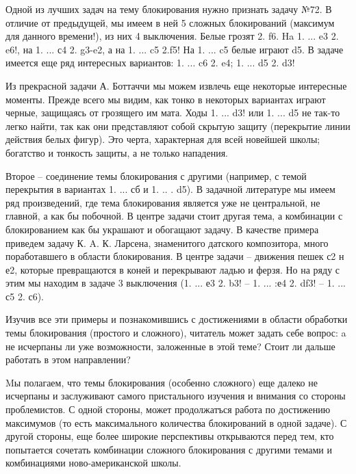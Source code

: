 Одной из лучших задач на тему блокирования нужно признать задачу №72. В отличие от предыдущей, мы имеем в ней 5 сложных блокирований (максимум для данного времени!), из них 4 выключения. Белые грозят 2. \queen{}f6\mate{}. Ha 1. ... \rook{}e3 2. \knight{}e6\mate{}!, на 1. ... \knight{}с4 2. \knight{}g3-e2\mate{}, а на 1. ... c5 2.\knight{}f5\mate{}! На 1. ... \rook{}c5 белые играют \knight{}d5\mate{}. В задаче имеется еще ряд интересных вариантов: 1. ... c6 2. \rook{}e4\mate{}; 1. ... d5 2. \knight{}d3\mate{}!
	
Из прекрасной задачи А. Боттаччи мы можем извлечь еще некоторые интересные моменты. Прежде всего мы видим, как тонко в некоторых вариантах играют черные, защищаясь от грозящего им мата. Ходы 1. ... \rook{}d3! или 1. ... d5 не так-то легко найти, так как они представляют собой скрытую защиту (перекрытие линии действия белых фигур). Это черта, характерная для всей новейшей школы; богатство и тонкость защиты, а не только нападения.

Второе -- соединение темы блокирования с другими (например, с темой перекрытия в вариантах 1. ... сб и 1. .. . d5). В задачной литературе мы имеем ряд произведений, где тема блокирования является уже не центральной, не главной, а как бы побочной. В центре задачи стоит другая тема, а комбинации с блокированием как бы украшают и обогащают задачу. В качестве примера приведем задачу К. A. К. Ларсена, знаменитого датского композитора, много поработавшего в области блокирования. В центре задачи -- движения пешек с2 н е2, которые превращаются в коней и перекрывают ладью и ферзя. Но на ряду с этим мы находим в задаче 3 выключения (1. ... \queen{}е3 2. \knight{}b3\mate{}! -- 1. ... \bishop{}:е4 2. \knight{}df3\mate{}! -- 1. ... \knight{}с5 2. \knight{}с6\mate{}).

Изучив все эти примеры и познакомившись с достижениями в области обработки темы блокирования (простого и сложного), читатель может задать себе вопрос: a не исчерпаны ли уже возможности, заложенные в этой теме? Стоит ли дальше работать в этом направлении?

Mы полагаем, что темы блокирования (особенно сложного) еще далеко не исчерпаны и заслуживают самого пристального изучения и внимания со стороны проблемистов. С одной стороны, может продолжатъся работа по достижению максимумов (то есть максимального количества блокирований в одной задаче). С другой стороны, еще более широкие перспективы открываются перед тем, кто попытается сочетать комбинации сложного блокирования с другими темами и комбинациями ново-американской школы.
